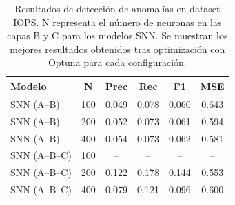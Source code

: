\begin{table}[htbp]
\centering
\small
\begin{tabular}{lccccc}
\hline\hline
\textbf{Modelo} & \textbf{N} & \textbf{Prec} & \textbf{Rec} & \textbf{F1} & \textbf{MSE} \\
\hline
SNN (A--B) & 100 & 0.049 & 0.078 & 0.060 & 0.643 \\
SNN (A--B) & 200 & 0.052 & 0.073 & 0.061 & 0.594 \\
SNN (A--B) & 400 & 0.054 & 0.073 & 0.062 & 0.581 \\
\hline
SNN (A--B--C) & 100 & -- & -- & -- & -- \\
SNN (A--B--C) & 200 & 0.122 & 0.178 & 0.144 & 0.553 \\
SNN (A--B--C) & 400 & 0.079 & 0.121 & 0.096 & 0.600 \\
\hline\hline
\end{tabular}
\caption{Resultados de detección de anomalías en dataset IOPS. N representa el número de neuronas en las capas B y C para los modelos SNN. Se muestran los mejores resultados obtenidos tras optimización con Optuna para cada configuración.}
\label{tab:resultados-iops-escalabilidad}
\end{table}